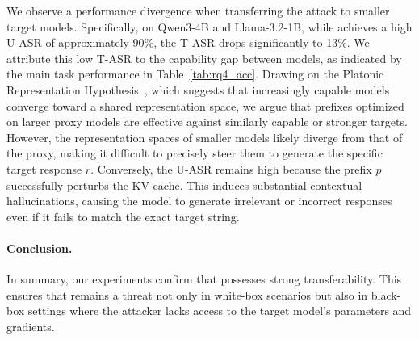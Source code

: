 We observe a performance divergence when transferring the attack to smaller target models. Specifically, on Qwen3-4B and Llama-3.2-1B, while \sys achieves a high U-ASR of approximately 90\%, the T-ASR drops significantly to 13\%. We attribute this low T-ASR to the capability gap between models, as indicated by the main task performance in Table~\ref{tab:rq4_acc}. 
% 
Drawing on the Platonic Representation Hypothesis~\cite{huh2024position}, which suggests that increasingly capable models converge toward a shared representation space, we argue that prefixes optimized on larger proxy models are effective against similarly capable or stronger targets. However, the representation spaces of smaller models likely diverge from that of the proxy, making it difficult to precisely steer them to generate the specific target response $\tilde{r}$. Conversely, the U-ASR remains high because the prefix $p$ successfully perturbs the KV cache. This induces substantial contextual hallucinations, causing the model to generate irrelevant or incorrect responses even if it fails to match the exact target string.

\paragraph{Conclusion.}
In summary, our experiments confirm that \sys possesses strong transferability. This ensures that \sys remains a threat not only in white-box scenarios but also in black-box settings where the attacker lacks access to the target model's parameters and gradients.

